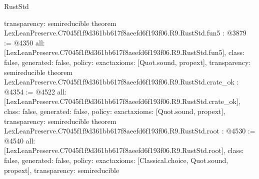 \begin{lexlean}{RustStd}
\begin{coremodule}
{  transparency: semireducible
}
theorem LexLeanPreserve.C7045f1f9d361bb617f8aeefd6f193f06.R9.RustStd.fun5 : @3879 := @4350 {
  all: [LexLeanPreserve.C7045f1f9d361bb617f8aeefd6f193f06.R9.RustStd.fun5],
  class: false,
  generated: false,
  policy: exact{axioms: [Quot.sound, propext]},
  transparency: semireducible
}
theorem LexLeanPreserve.C7045f1f9d361bb617f8aeefd6f193f06.R9.RustStd.crate_ok : @4354 := @4522 {
  all: [LexLeanPreserve.C7045f1f9d361bb617f8aeefd6f193f06.R9.RustStd.crate_ok],
  class: false,
  generated: false,
  policy: exact{axioms: [Quot.sound, propext]},
  transparency: semireducible
}
theorem LexLeanPreserve.C7045f1f9d361bb617f8aeefd6f193f06.R9.RustStd.root : @4530 := @4540 {
  all: [LexLeanPreserve.C7045f1f9d361bb617f8aeefd6f193f06.R9.RustStd.root],
  class: false,
  generated: false,
  policy: exact{axioms: [Classical.choice, Quot.sound, propext]},
  transparency: semireducible
}


\end{coremodule}
\end{lexlean}
